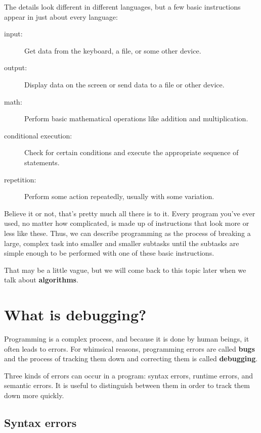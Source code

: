 The details look different in
different languages, but a few basic instructions
appear in just about every language:

\begin{description}

\item[input:] Get data from the keyboard, a file, or some
other device.

\item[output:] Display data on the screen or send data to a
file or other device.

\item[math:] Perform basic mathematical operations like addition and
multiplication.

\item[conditional execution:] Check for certain conditions and
execute the appropriate sequence of statements.

\item[repetition:] Perform some action repeatedly, usually with
some variation.

\end{description}

Believe it or not, that's pretty much all there is to it.  Every
program you've ever used, no matter how complicated, is made up of
instructions that look more or less like these.  Thus, we can
describe programming as the process of breaking a large, complex task
into smaller and smaller subtasks until the subtasks are
simple enough to be performed with one of these basic instructions.

That may be a little vague, but we will come back to this topic later
when we talk about {\bf algorithms}.

\section{What is debugging?}

Programming is a complex process, and because it is done by human beings,
it often leads to errors.  For whimsical reasons, programming errors are
called {\bf bugs} and the process of tracking them down and correcting them
is called {\bf debugging}.

Three kinds of errors can occur in a program: syntax errors, runtime 
errors, and semantic errors. It is useful
to distinguish between them in order to track them down more quickly.

\subsection{Syntax errors}

